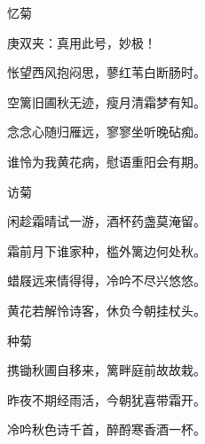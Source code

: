 \begin{poem}
    \begin{pl}忆菊　\end{pl}
    \begin{note}庚双夹：真用此号，妙极！\end{note}

    \begin{pl}怅望西风抱闷思，蓼红苇白断肠时。\end{pl}

    \begin{pl}空篱旧圃秋无迹，瘦月清霜梦有知。\end{pl}

    \begin{pl}念念心随归雁远，寥寥坐听晚砧痴。\end{pl}

    \begin{pl}谁怜为我黄花病，慰语重阳会有期。\end{pl}
    \emptypl

    \begin{pl}访菊　\end{pl}

    \begin{pl}闲趁霜晴试一游，酒杯药盏莫淹留。\end{pl}

    \begin{pl}霜前月下谁家种，槛外篱边何处秋。\end{pl}

    \begin{pl}蜡屐远来情得得，冷吟不尽兴悠悠。\end{pl}

    \begin{pl}黄花若解怜诗客，休负今朝挂杖头。\end{pl}
    \emptypl

    \begin{pl}种菊　\end{pl}

    \begin{pl}携锄秋圃自移来，篱畔庭前故故栽。\end{pl}

    \begin{pl}昨夜不期经雨活，今朝犹喜带霜开。\end{pl}

    \begin{pl}冷吟秋色诗千首，醉酹寒香酒一杯。\end{pl}


\end{poem}
